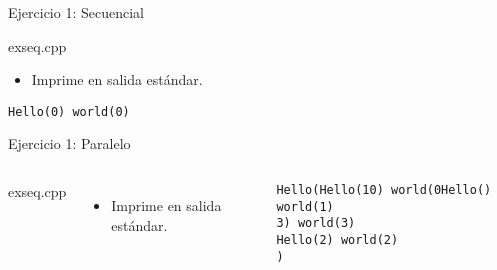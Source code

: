 \begin{frame}[t,fragile]{Ejercicio 1: Secuencial}
\begin{block}{exseq.cpp}

\end{block}
\begin{itemize}
  \item Imprime en salida estándar.
\end{itemize}
\begin{lstlisting}[style=terminal]
Hello(0) world(0)
\end{lstlisting}
\end{frame}

\begin{frame}[t,fragile]{Ejercicio 1: Paralelo}
\begin{columns}[T]

\begin{block}{exseq.cpp}

\end{block}

\begin{itemize}
  \item Imprime en salida estándar.
\end{itemize}
\begin{lstlisting}[style=terminal]
Hello(Hello(10) world(0Hello() world(1)
3) world(3)
Hello(2) world(2)
)
\end{lstlisting}

\end{columns}
\end{frame}

